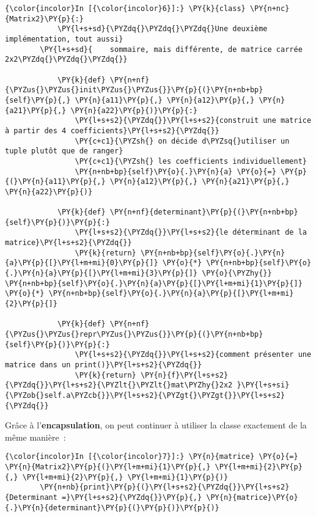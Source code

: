     \begin{Verbatim}[commandchars=\\\{\}]
{\color{incolor}In [{\color{incolor}6}]:} \PY{k}{class} \PY{n+nc}{Matrix2}\PY{p}{:}
            \PY{l+s+sd}{\PYZdq{}\PYZdq{}\PYZdq{}Une deuxième implémentation, tout aussi}
        \PY{l+s+sd}{    sommaire, mais différente, de matrice carrée 2x2\PYZdq{}\PYZdq{}\PYZdq{}}
            
            \PY{k}{def} \PY{n+nf}{\PYZus{}\PYZus{}init\PYZus{}\PYZus{}}\PY{p}{(}\PY{n+nb+bp}{self}\PY{p}{,} \PY{n}{a11}\PY{p}{,} \PY{n}{a12}\PY{p}{,} \PY{n}{a21}\PY{p}{,} \PY{n}{a22}\PY{p}{)}\PY{p}{:}
                \PY{l+s+s2}{\PYZdq{}}\PY{l+s+s2}{construit une matrice à partir des 4 coefficients}\PY{l+s+s2}{\PYZdq{}}
                \PY{c+c1}{\PYZsh{} on décide d\PYZsq{}utiliser un tuple plutôt que de ranger}
                \PY{c+c1}{\PYZsh{} les coefficients individuellement}
                \PY{n+nb+bp}{self}\PY{o}{.}\PY{n}{a} \PY{o}{=} \PY{p}{(}\PY{n}{a11}\PY{p}{,} \PY{n}{a12}\PY{p}{,} \PY{n}{a21}\PY{p}{,} \PY{n}{a22}\PY{p}{)}
                
            \PY{k}{def} \PY{n+nf}{determinant}\PY{p}{(}\PY{n+nb+bp}{self}\PY{p}{)}\PY{p}{:}
                \PY{l+s+s2}{\PYZdq{}}\PY{l+s+s2}{le déterminant de la matrice}\PY{l+s+s2}{\PYZdq{}}
                \PY{k}{return} \PY{n+nb+bp}{self}\PY{o}{.}\PY{n}{a}\PY{p}{[}\PY{l+m+mi}{0}\PY{p}{]} \PY{o}{*} \PY{n+nb+bp}{self}\PY{o}{.}\PY{n}{a}\PY{p}{[}\PY{l+m+mi}{3}\PY{p}{]} \PY{o}{\PYZhy{}} \PY{n+nb+bp}{self}\PY{o}{.}\PY{n}{a}\PY{p}{[}\PY{l+m+mi}{1}\PY{p}{]} \PY{o}{*} \PY{n+nb+bp}{self}\PY{o}{.}\PY{n}{a}\PY{p}{[}\PY{l+m+mi}{2}\PY{p}{]}
            
            \PY{k}{def} \PY{n+nf}{\PYZus{}\PYZus{}repr\PYZus{}\PYZus{}}\PY{p}{(}\PY{n+nb+bp}{self}\PY{p}{)}\PY{p}{:}
                \PY{l+s+s2}{\PYZdq{}}\PY{l+s+s2}{comment présenter une matrice dans un print()}\PY{l+s+s2}{\PYZdq{}}
                \PY{k}{return} \PY{n}{f}\PY{l+s+s2}{\PYZdq{}}\PY{l+s+s2}{\PYZlt{}\PYZlt{}mat\PYZhy{}2x2 }\PY{l+s+si}{\PYZob{}self.a\PYZcb{}}\PY{l+s+s2}{\PYZgt{}\PYZgt{}}\PY{l+s+s2}{\PYZdq{}}
\end{Verbatim}


    Grâce à l'\textbf{encapsulation}, on peut continuer à utiliser la classe
exactement de la même manière~:

    \begin{Verbatim}[commandchars=\\\{\}]
{\color{incolor}In [{\color{incolor}7}]:} \PY{n}{matrice} \PY{o}{=} \PY{n}{Matrix2}\PY{p}{(}\PY{l+m+mi}{1}\PY{p}{,} \PY{l+m+mi}{2}\PY{p}{,} \PY{l+m+mi}{2}\PY{p}{,} \PY{l+m+mi}{1}\PY{p}{)}
        \PY{n+nb}{print}\PY{p}{(}\PY{l+s+s2}{\PYZdq{}}\PY{l+s+s2}{Determinant =}\PY{l+s+s2}{\PYZdq{}}\PY{p}{,} \PY{n}{matrice}\PY{o}{.}\PY{n}{determinant}\PY{p}{(}\PY{p}{)}\PY{p}{)}
\end{Verbatim}


